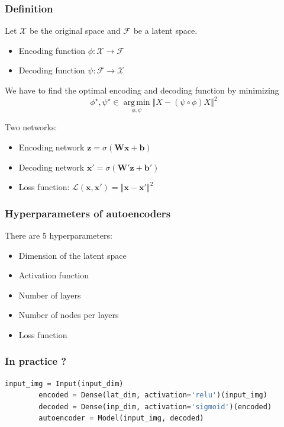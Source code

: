 \documentclass[11pt,a4paper]{beamer}
\DeclareMathOperator*{\Argmin}{arg\,min}
\newcommand{\argmin}[1]{\Argmin\limits_{#1}}
\begin{document}
\begin{frame}
	\frametitle{Definition}

	\begin{block}{}
	Let $\mathcal X$ be the original space and $\mathcal F$ be a latent space.
	\begin{itemize}
		\item Encoding function $\phi : \mathcal X \longrightarrow \mathcal F$
		\item Decoding function $\psi : \mathcal F \longrightarrow \mathcal X$
	\end{itemize}
	We have to find the optimal encoding and decoding function by minimizing
	$$\phi^\star, \psi^\star \in \argmin{\phi, \psi} \left\Vert X - (\psi \circ \phi) X \right\Vert^2$$
	\end{block}

	Two networks:
	\begin{itemize}
		\item Encoding network $\mathbf z = \sigma(\mathbf W \mathbf x + \mathbf b)$
		\item Decoding network $\mathbf x' = \sigma(\mathbf W' \mathbf z + \mathbf b')$
		\item Loss function: $\mathcal L(\mathbf x, \mathbf x') = \left\Vert \mathbf x - \mathbf x' \right\Vert^2$
	\end{itemize}
	
\end{frame}


\begin{frame}
	\frametitle{Hyperparameters of autoencoders}
	There are 5 hyperparameters:
	\begin{itemize}
		\item Dimension of the latent space
		\item Activation function
		\item Number of layers
		\item Number of nodes per layers
		\item Loss function
	\end{itemize}
\end{frame}


\begin{frame}[containsverbatim]
	\frametitle{In practice ?}

	\begin{lstlisting}[language=Python]
		input_img = Input(input_dim)
		encoded = Dense(lat_dim, activation='relu')(input_img)
		decoded = Dense(inp_dim, activation='sigmoid')(encoded)
		autoencoder = Model(input_img, decoded)
	\end{lstlisting}
\end{frame}
\end{document}
